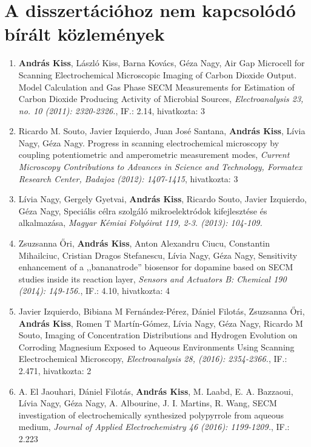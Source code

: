 \documentclass[11pt,a4paper,roman]{article}
\begin{document}
\section{A disszertációhoz nem kapcsolódó bírált közlemények}
\begin{enumerate}
\item \textbf{András Kiss}, László Kiss, Barna Kovács, Géza Nagy, Air Gap Microcell for Scanning Electrochemical Microscopic Imaging of Carbon Dioxide Output. Model Calculation and Gas Phase SECM Measurements for Estimation of Carbon Dioxide Producing Activity of Microbial Sources, \emph{Electroanalysis 23, no. 10 (2011): 2320-2326.}, IF.: 2.14, hivatkozta: 3

\item Ricardo M. Souto, Javier Izquierdo, Juan José Santana, \textbf{András Kiss}, Lívia Nagy, Géza Nagy. Progress in scanning electrochemical microscopy by coupling potentiometric and amperometric measurement modes, \emph{Current Microscopy Contributions to Advances in Science and Technology, Formatex Research Center, Badajoz (2012): 1407-1415}, hivatkozta: 3

\item Lívia Nagy, Gergely Gyetvai, \textbf{András Kiss}, Ricardo Souto, Javier Izquierdo, Géza Nagy, Speciális célra szolgáló mikroelektródok kifejlesztése és alkalmazása, \emph{Magyar Kémiai Folyóirat 119, 2-3. (2013): 104-109.}

\item Zsuzsanna \H{O}ri, \textbf{András Kiss}, Anton Alexandru Ciucu, Constantin Mihailciuc, Cristian Dragos Stefanescu, Lívia Nagy, Géza Nagy, Sensitivity enhancement of a ,,bananatrode'' biosensor for dopamine based on SECM studies inside its reaction layer, \emph{Sensors and Actuators B: Chemical 190 (2014): 149-156.}, IF.: 4.10, hivatkozta: 4

\item Javier Izquierdo, Bibiana M Fernández-Pérez, Dániel Filotás, Zsuzsanna Őri, \textbf{András Kiss}, Romen T Martín-Gómez, Lívia Nagy, Géza Nagy, Ricardo M Souto, Imaging of Concentration Distributions and Hydrogen Evolution on Corroding Magnesium Exposed to Aqueous Environments Using Scanning Electrochemical Microscopy, \emph{Electroanalysis 28, (2016): 2354-2366.}, IF.: 2.471, hivatkozta: 2

\item A. El Jaouhari,  Dániel Filotás, \textbf{András Kiss}, M. Laabd, E. A. Bazzaoui, Lívia Nagy, Géza Nagy, A. Albourine, J. I. Martins, R. Wang, SECM investigation of electrochemically synthesized polypyrrole from aqueous medium, \emph{Journal of Applied Electrochemistry 46 (2016): 1199-1209.}, IF.: 2.223

\end{enumerate}
\end{document}
